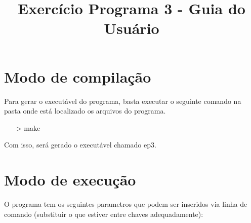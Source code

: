 \documentclass[11pt]{article}
\title{Exercício Programa 3  - Guia do Usuário}
\begin{document}
\maketitle

\section{Modo de compilaç\~ ao}

Para gerar o executável do programa, basta executar o seguinte comando na pasta onde está localizado os arquivos do programa.

\begin{itemize}

\item[>]make

\end{itemize}

Com isso, será gerado o executável chamado ep3.

\section{Modo de execução}

O programa tem os seguintes parametros que podem ser inseridos via linha de comando (substituir o que estiver entre chaves adequadamente):
\end{document}
